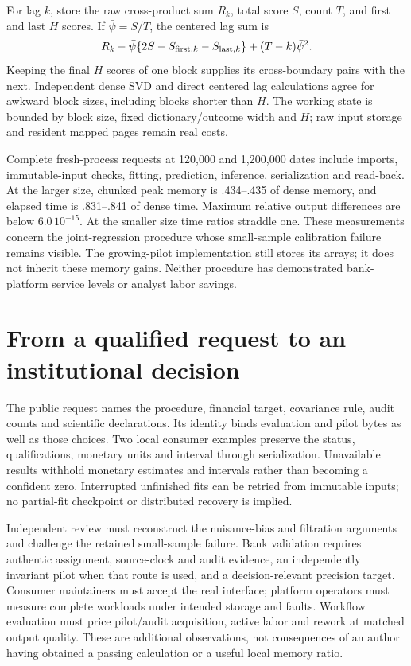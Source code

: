 For lag $k$, store the raw cross-product sum $R_k$, total score $S$, count $T$,
and first and last $H$ scores. If $\bar\psi=S/T$, the centered lag sum is
\[
 R_k-\bar\psi\{2S-S_{{\rm first},k}-S_{{\rm last},k}\}
       +(T-k)\bar\psi^2.
\]
Keeping the final $H$ scores of one block supplies its cross-boundary pairs
with the next. Independent dense SVD and direct centered lag calculations
agree for awkward block sizes, including blocks shorter than $H$. The
working state is bounded by block size, fixed dictionary/outcome width and
$H$; raw input storage and resident mapped pages remain real costs.

Complete fresh-process requests at 120,000 and 1,200,000 dates include imports,
immutable-input checks, fitting, prediction, inference, serialization and
read-back. At the larger size, chunked peak memory is .434--.435 of dense
memory, and elapsed time is .831--.841 of dense time. Maximum relative
output differences are below $6.0\,10^{-15}$. At the smaller size time ratios
straddle one. These measurements concern the joint-regression procedure whose
small-sample calibration failure remains visible. The growing-pilot
implementation still stores its arrays; it does not inherit these memory gains.
Neither procedure has demonstrated bank-platform service levels or analyst
labor savings.

\section{From a qualified request to an institutional decision}
\label{v9:external}

The public request names the procedure, financial target, covariance rule,
audit counts and scientific declarations. Its identity binds evaluation and
pilot bytes as well as those choices. Two local consumer examples preserve
the status, qualifications, monetary units and interval through serialization.
Unavailable results withhold monetary estimates and intervals rather than
becoming a confident zero. Interrupted unfinished fits can be retried from
immutable inputs; no partial-fit checkpoint or distributed recovery is implied.

Independent review must reconstruct the nuisance-bias and filtration arguments
and challenge the retained small-sample failure. Bank validation requires
authentic assignment, source-clock and audit evidence, an independently
invariant pilot when that route is used, and a decision-relevant precision
target. Consumer maintainers must accept the real interface; platform operators
must measure complete workloads under intended storage and faults. Workflow
evaluation must price pilot/audit acquisition, active labor and rework at matched
output quality. These are additional observations, not consequences of an
author having obtained a passing calculation or a useful local memory ratio.
